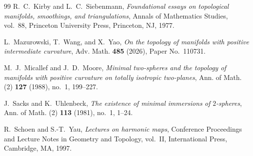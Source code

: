 \documentclass[11pt]{amsart}
\theoremstyle{definition}
\begin{document}
\begin{thebibliography}{99}
R.~C.~Kirby and L.~C.~Siebenmann,
\emph{Foundational essays on topological manifolds, smoothings,
and triangulations}, Annals of Mathematics Studies, vol.~88,
Princeton University Press, Princeton, NJ, 1977.

L.~Mazurowski, T.~Wang, and X.~Yao,
\emph{On the topology of manifolds with positive intermediate curvature},
Adv. Math. \textbf{485} (2026), Paper No.~110731.

M.~J.~Micallef and J.~D.~Moore, \emph{Minimal two-spheres and the topology of manifolds with positive curvature on totally isotropic two-planes}, Ann. of Math. (2) \textbf{127} (1988), no.~1, 199--227.

J.~Sacks and K.~Uhlenbeck,
\emph{The existence of minimal immersions of $2$-spheres},
Ann. of Math. (2) \textbf{113} (1981), no.~1, 1--24.

R.~Schoen and S.-T.~Yau,
\emph{Lectures on harmonic maps},
Conference Proceedings and Lecture Notes in Geometry and Topology,
vol.~II, International Press, Cambridge, MA, 1997.

\end{thebibliography}
\end{document}
